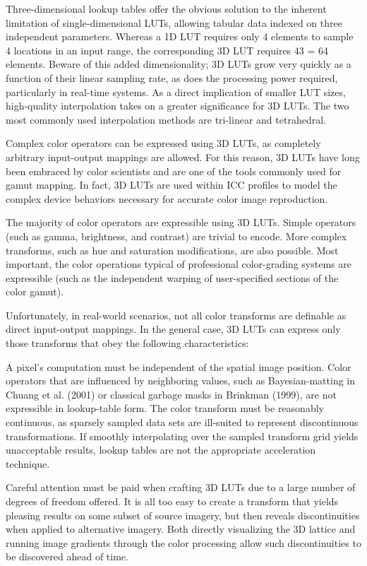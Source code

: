 Three-dimensional lookup tables offer the obvious solution to the inherent limitation of single-dimensional LUTs, allowing tabular data indexed on three independent parameters. Whereas a 1D LUT requires only 4 elements to sample 4 locations in an input range, the corresponding 3D LUT requires 43 = 64 elements. Beware of this added dimensionality; 3D LUTs grow very quickly as a function of their linear sampling rate, as does the processing power required, particularly in real-time systems. As a direct implication of smaller LUT sizes, high-quality interpolation takes on a greater significance for 3D LUTs. The two most commonly used interpolation methods are tri-linear and tetrahedral.



Complex color operators can be expressed using 3D LUTs, as completely arbitrary input-output mappings are allowed. For this reason, 3D LUTs have long been embraced by color scientists and are one of the tools commonly used for gamut mapping. In fact, 3D LUTs are used within ICC profiles to model the complex device behaviors necessary for accurate color image reproduction.

The majority of color operators are expressible using 3D LUTs. Simple operators (such as gamma, brightness, and contrast) are trivial to encode. More complex transforms, such as hue and saturation modifications, are also possible. Most important, the color operations typical of professional color-grading systems are expressible (such as the independent warping of user-specified sections of the color gamut).

Unfortunately, in real-world scenarios, not all color transforms are definable as direct input-output mappings. In the general case, 3D LUTs can express only those transforms that obey the following characteristics:

A pixel's computation must be independent of the spatial image position. Color operators that are influenced by neighboring values, such as Bayesian-matting in Chuang et al. (2001) or classical garbage masks in Brinkman (1999), are not expressible in lookup-table form.
The color transform must be reasonably continuous, as sparsely sampled data sets are ill-suited to represent discontinuous transformations. If smoothly interpolating over the sampled transform grid yields unacceptable results, lookup tables are not the appropriate acceleration technique.

Careful attention must be paid when crafting 3D LUTs due to a large number of degrees of freedom offered. It is all too easy to create a transform that yields pleasing results on some subset of source imagery, but then reveals discontinuities when applied to alternative imagery. Both directly visualizing the 3D lattice and running image gradients through the color processing allow such discontinuities to be discovered ahead of time.

